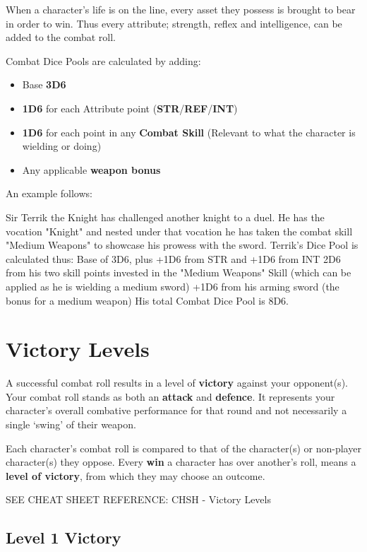 When a character's life is on the line, every asset they possess is brought to bear in order to win. Thus every attribute; strength, reflex and intelligence, can be added to the combat roll.

Combat Dice Pools are calculated by adding:
\begin{itemize}[label=+]
    \item[~] Base \textbf{3D6}
    \item \textbf{1D6} for each Attribute point (\textbf{STR}/\textbf{REF}/\textbf{INT})
    \item \textbf{1D6} for each point in any \textbf{Combat Skill} (Relevant to what the character is wielding or doing)
    \item Any applicable \textbf{weapon bonus}
\end{itemize}

An example follows:
\begin{displayquote}
Sir Terrik the Knight has challenged another knight to a duel. He has the vocation "Knight" and nested under that vocation he has taken the combat skill "Medium Weapons" to showcase his prowess with the sword. Terrik's Dice Pool is calculated thus:
Base of 3D6, plus +1D6 from STR and +1D6 from INT
2D6 from his two skill points invested in the "Medium Weapons" Skill    (which can be applied as he is wielding a medium sword)
+1D6 from his arming sword (the bonus for a medium weapon)
His total Combat Dice Pool is 8D6.
\end{displayquote}

\section{Victory Levels}\label{sec:victory_levels}

A successful combat roll results in a level of \textbf{victory} against your opponent(s). Your combat roll stands as both an \textbf{attack} and \textbf{defence}. It represents your character’s overall combative performance for that round and not necessarily a single ‘swing’ of their weapon.

Each character’s combat roll is compared to that of the character(s) or non-player character(s) they oppose. Every \textbf{win} a character has over another’s roll, means a \textbf{level of victory}, from which they may choose an outcome.

SEE CHEAT SHEET REFERENCE: CHSH - Victory Levels

\subsection{Level 1 Victory} \label{subsec:level_1_victory}

